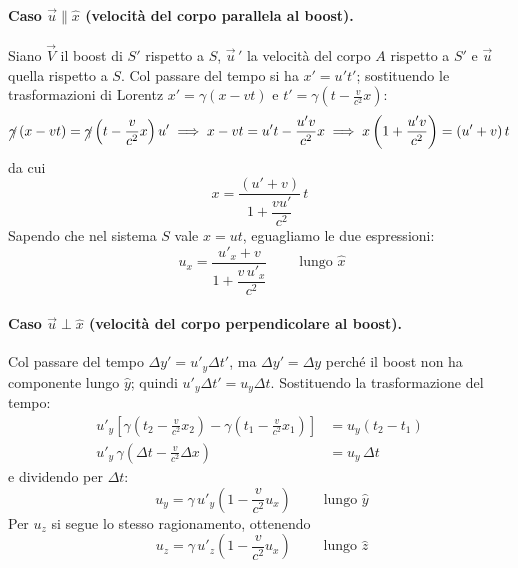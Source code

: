 \paragraph{Caso $\vec{u} \parallel \hat{x}$ (velocità del corpo parallela al boost).}
Siano $\vec{V}$ il boost di $S'$ rispetto a $S$, $\vec{u}\,'$ la velocità del corpo $A$ rispetto a $S'$ e $\vec{u}$ quella rispetto a $S$. Col passare del tempo si ha $x' = u' t'$; sostituendo le trasformazioni di Lorentz $x' = \gamma(x-vt)$ e $t' = \gamma\left(t - \frac{v}{c^2}x\right)$:
\begin{equation*}
    \cancel{\gamma}\,(x - vt) = \cancel{\gamma}\left(t - \frac{v}{c^2}x\right) u'
    \implies x - vt = u't - \frac{u'v}{c^2}x
    \implies x\left(1 + \frac{u'v}{c^2}\right) = (u'+v)\,t
\end{equation*}
da cui
\begin{equation*}
    x = \frac{(u'+v)}{1 + \dfrac{vu'}{c^2}}\, t
\end{equation*}
Sapendo che nel sistema $S$ vale $x = ut$, eguagliamo le due espressioni:
\begin{equation}
    \boxed{\;u_x = \frac{u'_x + v}{1 + \dfrac{v\,u'_x}{c^2}}\;}
    \qquad \text{lungo } \hat{x}
\end{equation}

\paragraph{Caso $\vec{u} \perp \hat{x}$ (velocità del corpo perpendicolare al boost).}
Col passare del tempo $\Delta y' = u'_y \Delta t'$, ma $\Delta y' = \Delta y$ perché il boost non ha componente lungo $\hat{y}$; quindi $u'_y \Delta t' = u_y \Delta t$. Sostituendo la trasformazione del tempo:
\begin{align*}
    u'_y \left[ \gamma\left(t_2 - \frac{v}{c^2}x_2\right) - \gamma\left(t_1 - \frac{v}{c^2}x_1\right) \right] &= u_y (t_2 - t_1) \\
    u'_y \, \gamma \left( \Delta t - \frac{v}{c^2}\Delta x \right) &= u_y \, \Delta t
\end{align*}
e dividendo per $\Delta t$:
\begin{equation}
    \boxed{\;u_y = \gamma \, u'_y \left(1 - \frac{v}{c^2}u_x\right)\;}
    \qquad \text{lungo } \hat{y}
\end{equation}
Per $u_z$ si segue lo stesso ragionamento, ottenendo
\begin{equation}
    \boxed{\;u_z = \gamma \, u'_z \left(1 - \frac{v}{c^2}u_x\right)\;}
    \qquad \text{lungo } \hat{z}
\end{equation}

